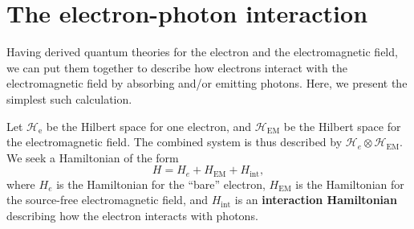 \documentclass[pra,12pt]{revtex4}
\begin{document}
\section{The electron-photon interaction}
\label{sec:decay}

Having derived quantum theories for the electron and the
electromagnetic field, we can put them together to describe how
electrons interact with the electromagnetic field by absorbing and/or
emitting photons.  Here, we present the simplest such calculation.

Let $\mathscr{H}_{\mathrm{e}}$ be the Hilbert space for one electron,
and $\mathscr{H}_{\mathrm{EM}}$ be the Hilbert space for the
electromagnetic field.  The combined system is thus described by
$\mathscr{H}_e \otimes \mathscr{H}_{\mathrm{EM}}$.  We seek a
Hamiltonian of the form
\begin{equation}
  H = H_e + H_{\mathrm{EM}} + H_{\mathrm{int}},
\end{equation}
where $H_e$ is the Hamiltonian for the ``bare'' electron,
$H_{\mathrm{EM}}$ is the Hamiltonian for the source-free
electromagnetic field, and $H_{\mathrm{int}}$ is an
\textbf{interaction Hamiltonian} describing how the electron interacts
with photons.
\end{document}
